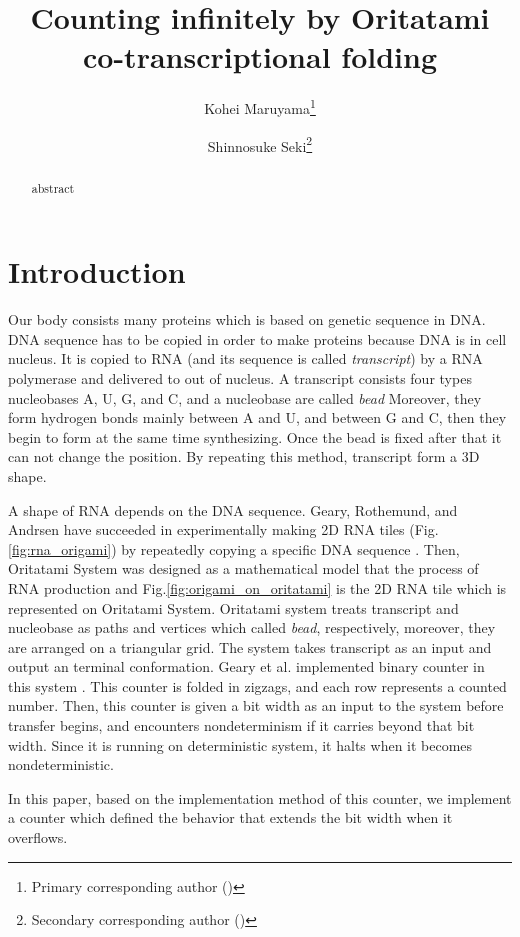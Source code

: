 \documentclass[runningheads]{llncs}
\title{Counting infinitely by Oritatami co-transcriptional folding}
\author{
Kohei Maruyama\inst{1}\thanks{Primary corresponding author (\email{k.maruyama@uec.ac.jp})} \and
Shinnosuke Seki\inst{1}\thanks{Secondary corresponding author (\email{s.seki@uec.ac.jp})}
}
\institute{
The University of Electro-Communications, 
1-5-1 Chofugaoka, Chofu, Tokyo, 1828585, Japan \\
}
\begin{document}
\maketitle

\begin{abstract}
abstract
\end{abstract}

	\section{Introduction}
Our body consists many proteins which is based on genetic sequence in DNA.
DNA sequence has to be copied in order to make proteins because DNA is in cell nucleus.
It is copied to RNA (and its sequence is called \textit{transcript}) by a RNA polymerase and delivered to out of nucleus.
A transcript consists four types nucleobases A, U, G, and C, and a nucleobase are called \textit{bead}
Moreover, they form hydrogen bonds mainly between A and U, and between G and C, then they begin to form at the same time synthesizing.
Once the bead is fixed after that it can not change the position.
By repeating this method, transcript form a 3D shape.

A shape of RNA depends on the DNA sequence.
Geary, Rothemund, and Andrsen have succeeded in experimentally making 2D RNA tiles (Fig.\ref{fig:rna_origami}) by repeatedly copying a specific DNA sequence \cite{GearyRothemundAndersen2014}.
Then, Oritatami System was designed as a mathematical model that the process of RNA production \cite{counter2016} and Fig.\ref{fig:origami_on_oritatami} is the 2D RNA tile which is represented on Oritatami System.
Oritatami system treats transcript and nucleobase as paths and vertices which called \textit{bead}, respectively, moreover, they are arranged on a triangular grid.
The system takes transcript as an input and output an terminal conformation.
Geary et al. implemented binary counter in this system \cite{counter2016}.
This counter is folded in zigzags, and each row represents a counted number.
Then, this counter is given a bit width as an input to the system before transfer begins, and encounters nondeterminism if it carries beyond that bit width.
Since it is running on deterministic system, it halts when it becomes nondeterministic.

In this paper, based on the implementation method of this counter, we implement a counter which defined the behavior that extends the bit width when it overflows.
\end{document}
